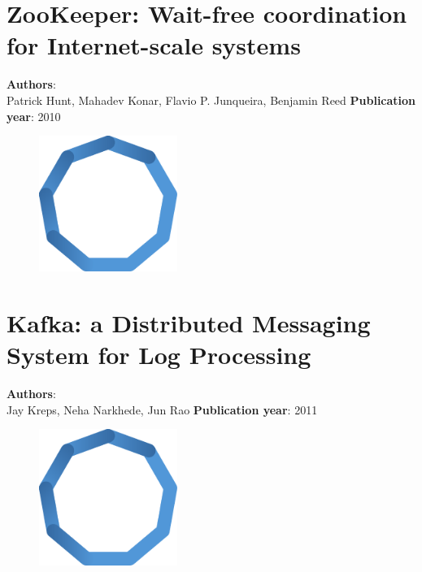 \documentclass[11pt,fleqn]{book} %
\begin{document}
\chapter{ZooKeeper: Wait-free coordination for Internet-scale systems}
\vspace*{-7mm}
\Large \textbf{Authors}: \\
Patrick Hunt, Mahadev Konar, Flavio P. Junqueira, Benjamin Reed
\newline\newline
\textbf{Publication year}: 2010
\begin{figure}[b]
    \centering
    \includegraphics[width=0.4\textwidth]{distributed-systems-blue.pdf}
\end{figure}


\chapter{Kafka: a Distributed Messaging System for Log Processing}
\vspace*{-7mm}
\Large \textbf{Authors}: \\
Jay Kreps, Neha Narkhede, Jun Rao
\newline\newline
\textbf{Publication year}: 2011
\begin{figure}[b]
    \centering
    \includegraphics[width=0.4\textwidth]{distributed-systems-blue.pdf}
\end{figure}

\end{document}
